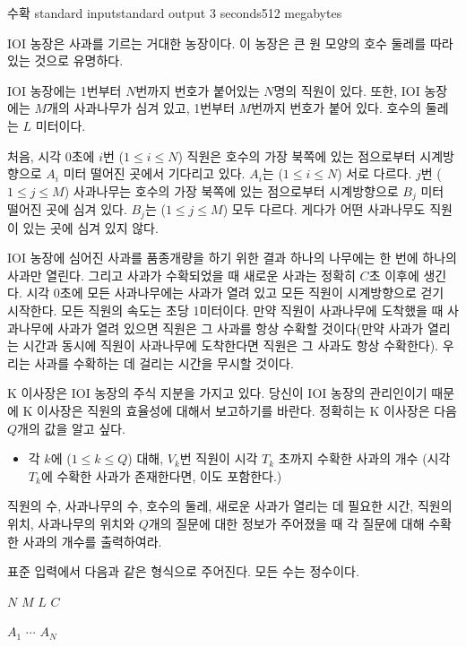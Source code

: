 \begin{problem}{수확}
	{standard input}{standard output}
	{3 seconds}{512 megabytes}{}
	
	IOI 농장은 사과를 기르는 거대한 농장이다. 이 농장은 큰 원 모양의 호수 둘레를 따라 있는 것으로 유명하다.
	
	IOI 농장에는 1번부터 $N$번까지 번호가 붙어있는 $N$명의 직원이 있다. 또한, IOI 농장에는 $M$개의 사과나무가 심겨 있고, 1번부터 $M$번까지 번호가 붙어 있다. 호수의 둘레는 $L$ 미터이다.
	
	처음, 시각 0초에 $i$번 ($1 \le i \le N$) 직원은 호수의 가장 북쪽에 있는 점으로부터 시계방향으로 $A_i$ 미터 떨어진 곳에서 기다리고 있다. $A_i$는 ($1 \le i \le N$) 서로 다르다. $j$번 ($1 \le j \le M$) 사과나무는 호수의 가장 북쪽에 있는 점으로부터 시계방향으로 $B_j$ 미터 떨어진 곳에 심겨 있다. $B_j$는 ($1 \le j \le M$) 모두 다르다. 게다가 어떤 사과나무도 직원이 있는 곳에 심겨 있지 않다.
	
	IOI 농장에 심어진 사과를 품종개량을 하기 위한 결과 하나의 나무에는 한 번에 하나의 사과만 열린다. 그리고 사과가 수확되었을 때 새로운 사과는 정확히 $C$초 이후에 생긴다. 시각 0초에 모든 사과나무에는 사과가 열려 있고 모든 직원이 시계방향으로 걷기 시작한다. 모든 직원의 속도는 초당 1미터이다. 만약 직원이 사과나무에 도착했을 때 사과나무에 사과가 열려 있으면 직원은 그 사과를 항상 수확할 것이다(만약 사과가 열리는 시간과 동시에 직원이 사과나무에 도착한다면 직원은 그 사과도 항상 수확한다). 우리는 사과를 수확하는 데 걸리는 시간을 무시할 것이다.
	
	K 이사장은 IOI 농장의 주식 지분을 가지고 있다. 당신이 IOI 농장의 관리인이기 때문에 K 이사장은 직원의 효율성에 대해서 보고하기를 바란다. 정확히는 K 이사장은 다음 $Q$개의 값을 알고 싶다.
	
	\begin{itemize}
		\item[] 각 $k$에 ($1 \le k \le Q$) 대해, $V_k$번 직원이 시각 $T_k$ 초까지 수확한 사과의 개수 (시각 $T_k$에 수확한 사과가 존재한다면, 이도 포함한다.)
	\end{itemize}
	
	직원의 수, 사과나무의 수, 호수의 둘레, 새로운 사과가 열리는 데 필요한 시간, 직원의 위치, 사과나무의 위치와 $Q$개의 질문에 대한 정보가 주어졌을 때 각 질문에 대해 수확한 사과의 개수를 출력하여라.
	
	
	\InputFile
	
	표준 입력에서 다음과 같은 형식으로 주어진다. 모든 수는 정수이다.
	
	$N$ $M$ $L$ $C$
	
	$A_1$ $\cdots$ $A_N$
	

\end{problem}
